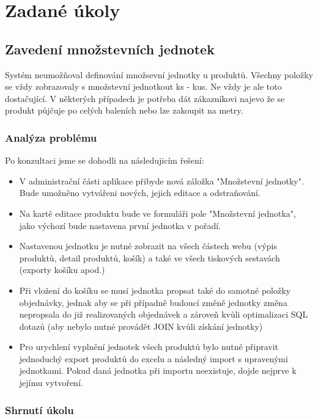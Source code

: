 \chapter{Zadané úkoly}

\section{Zavedení množstevních jednotek}

Systém neumožňoval definování množsevní jednotky u produktů. Všechny položky se vždy zobrazovaly s množstevní jednotkout ks - kus. Ne vždy je ale toto dostačující. V některých případech je potřeba dát zákazníkovi najevo že se produkt půjčuje po celých baleních nebo lze zakoupit na metry.

\subsection{Analýza problému}

Po konzultaci jsme se dohodli na následujicím řešení:

\begin{itemize}
    \item V administrační části aplikace přibyde nová záložka "Množstevní jednotky". Bude umožněno vytvářeni nových, jejich editace a odstraňování.
    \item Na kartě editace produktu bude ve formuláři pole "Množstevní jednotka", jako výchozí bude nastavena první jednotka v pořadí.
    \item Nastavenou jednotku je nutné zobrazit na všech částech webu (výpis produktů, detail produktů, košík) a také ve všech tiskových sestavách (exporty košíku apod.) 
    \item Při vložení do košíku se musí jednotka propsat také do samotné položky objednávky, jednak aby se při případně budoucí změně jednotky změna nepropsala do již realizovaných objednávek a zároveň kvůli optimalizaci SQL dotazů (aby nebylo nutné provádět JOIN kvůli získání jednotky)
    \item Pro urychlení vyplnění jednotek všech produktů bylo nutné připravit jednoduchý export produktů do excelu a následný import s upravenými jednotkami. Pokud daná jednotka při importu neexistuje, dojde nejprve k jejímu vytvoření.
\end{itemize}

\subsection{Shrnutí úkolu}

